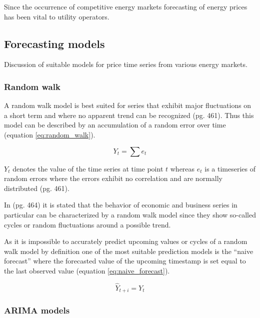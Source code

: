 Since the occurrence of competitive energy markets forecasting of energy prices has been vital to utility operators. 


\subsection{Forecasting models}

Discussion of suitable models for price time series from various energy markets. 


\subsubsection{Random walk}

A random walk model is best suited for series that exhibit major fluctuations on a short term and where no apparent trend can be recognized \cite{makridakisforecasting}(pg. 461). Thus this model can be described by an accumulation of a random error over time (equation \ref{eq:random_walk}). 

\begin{equation}
Y_t = \sum e_t
\label{eq:random_walk}
\end{equation}

$Y_t$ denotes the value of the time series at time point $t$ whereas $e_t$ is a timeseries of random errors where the errors exhibit no correlation and are normally distributed \cite{makridakisforecasting}(pg. 461). 

In \cite{makridakisforecasting}(pg. 464) it is stated that the behavior of economic and business series in particular can be characterized by a random walk model since they show so-called cycles or random fluctuations around a possible trend. 

As it is impossible to accurately predict upcoming values or cycles of a random walk model by definition one of the most suitable prediction models is the ``naive forecast'' where the forecasted value of the upcoming timestamp is set equal to the last observed value (equation \ref{eq:naive_forecast}).

\begin{equation}
\hat{Y}_{t+i} = Y_t
\label{eq:naive_forecast}
\end{equation}



\subsubsection{ARIMA models}

